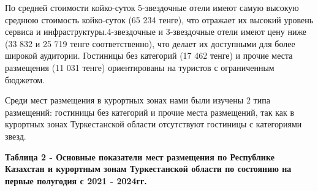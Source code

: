 По средней стоимости койко-суток 5-звездочные отели имеют самую высокую
среднюю стоимость койко-суток (65 234 тенге), что отражает их высокий
уровень сервиса и инфраструктуры.4-звездочные и 3-звездочные отели
имеют цену ниже (33 832 и 25 719 тенге соответственно), что делает их
доступными для более широкой аудитории. Гостиницы без категорий (17 462
тенге) и прочие места размещения (11 031 тенге) ориентированы на
туристов с ограниченным бюджетом.

Среди мест размещения в курортных зонах нами были изучены 2 типа
размещений: гостиницы без категорий и прочие места размещений, так как в
курортных зонах Туркестанской области отсутствуют гостиницы с
категориями звезд.

{\bfseries Таблица 2 - Основные показатели мест размещения по Республике
Казахстан и курортным зонам Туркестанской области по состоянию на первые
полугодия с 2021 - 2024гг.}

